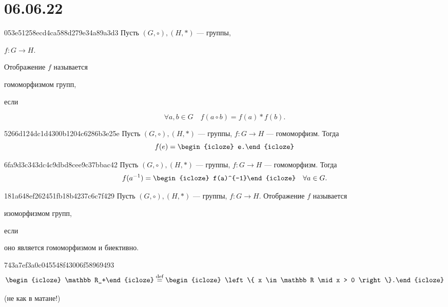 \section{06.06.22}
\begin{note}{053e51258ecd4ca588d279e34a89a3d3}
    Пусть \({ (G, \circ), (H, *) }\) --- группы,\: \begin{icloze}{3}\({ f : G \to H }\).\end{icloze}
    Отображение \({ f }\) называется \begin{icloze}{2}гомоморфизмом групп,\end{icloze} если
    \begin{icloze}{1}
        \[
            \forall a, b \in G \quad f(a \circ b) = f(a) * f(b).
        \]
    \end{icloze}
\end{note}

\begin{note}{5266d124dc1d4300b1204c6286b3e25e}
    Пусть \({ (G, \circ), (H, *) }\) --- группы,\: \({ f : G \to H }\) --- гомоморфизм.
    Тогда
    \[
        f(e) = \begin{icloze}{1}e.\end{icloze}
    \]
\end{note}

\begin{note}{6fa9d3c343dc4c9dbd8cee9c37bbac42}
    Пусть \({ (G, \circ), (H, *) }\) --- группы,\: \({ f : G \to H }\) --- гомоморфизм.
    Тогда
    \[
        f(a^{-1}) = \begin{icloze}{1}f(a)^{-1}\end{icloze} \quad \forall a \in G.
    \]
\end{note}

\begin{note}{181a648ef262451fb18b4237c6c7f429}
    Пусть \({ (G, \circ), (H, *) }\) --- группы,\: \({ f : G \to H }\).
    Отображение \({ f }\) называется \begin{icloze}{2}изоморфизмом групп,\end{icloze} если \begin{icloze}{1}оно является гомоморфизмом и биективно.\end{icloze}
\end{note}

\begin{note}{743a7ef3a0c045548f43006f58969493}
    \[
        \begin{icloze}{2}\mathbb R_+\end{icloze} \overset{\text{def}}= \begin{icloze}{1}\left\{ x \in \mathbb R \mid x > 0 \right\}.\end{icloze}
    \]

    \begin{center}
        \tiny
        (не как в матане!)
    \end{center}
\end{note}

